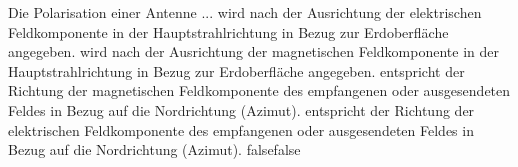     {Die Polarisation einer Antenne ...}
    {wird nach der Ausrichtung der elektrischen Feldkomponente in der Hauptstrahlrichtung in Bezug zur Erdoberfläche angegeben.}
    {wird nach der Ausrichtung der magnetischen Feldkomponente in der Hauptstrahlrichtung in Bezug zur Erdoberfläche angegeben.}
    {entspricht der Richtung der magnetischen Feldkomponente des empfangenen oder ausgesendeten Feldes in Bezug auf die Nordrichtung (Azimut).}
    {entspricht der Richtung der elektrischen Feldkomponente des empfangenen oder ausgesendeten Feldes in Bezug auf die Nordrichtung (Azimut).}
    {false}{false}